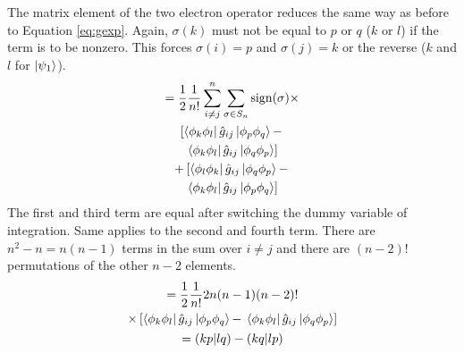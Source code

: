 \documentclass[final,3p,times,twocolumn]{elsarticle}
\begin{document}
\begin{enumerate}
	The matrix element of the two electron operator reduces the same way as before to Equation \eqref{eq:gexp}.
	Again, $\sigma(k)$ must not be equal to $p$ or $q$ ($k$ or $l$) if the term is to be nonzero. This forces $\sigma(i) = p$ and $\sigma(j) = k$ or the reverse ($k$ and $l$ for $\ket{\psi_1}$).
		\begin{gather}
	\begin{gathered}
	= \frac{1}{2}\frac{1}{n!} \sum_{i \neq j}^n \sum_{\sigma\in S_n} \text{sign}(\sigma) \times \\ \left[ \bra{\phi_{k}\phi_{l}}\hat g_{ij} \ket{\phi_{p}\phi_{q}} - \right.
	\\ \left. \bra{\phi_{k}\phi_{l}}\hat g_{ij} \ket{\phi_{q}\phi_{p}} \right] \\
	+ \left[ \bra{\phi_{l}\phi_{k}}\hat g_{ij} \ket{\phi_{q}\phi_{p}} - \right.\\ \left. \bra{\phi_{k}\phi_{l}}\hat g_{ij} \ket{\phi_{p}\phi_{q}} \right] 
	\end{gathered}
	\end{gather}
	The first and third term are equal after switching the dummy variable of integration. Same applies to the second and fourth term. There are $n^2-n = n(n-1)$ terms in the sum over $i \neq j$ and there are $(n-2)!$ permutations of the other $n-2$ elements.
	\begin{gather}
	\begin{gathered}
	= \frac{1}{2}\frac{1}{n!}2 n(n-1)(n-2)! \\ \times \left[ \bra{\phi_{k}\phi_{l}}\hat g_{ij} \ket{\phi_{p}\phi_{q}} - \right.
	\left. \bra{\phi_{k}\phi_{l}}\hat g_{ij} \ket{\phi_{q}\phi_{p}} \right] \\
	\end{gathered}\\
	=(kp|lq) - (kq|lp)
	\end{gather}
	

\end{enumerate}
\end{document}
